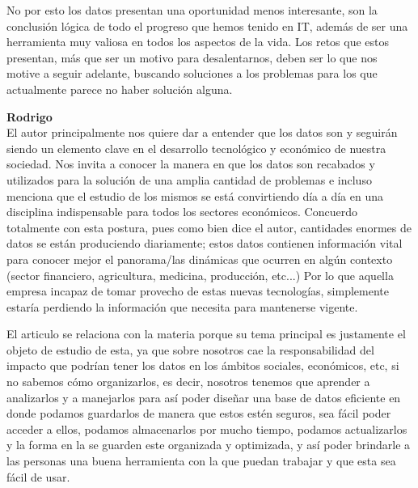 \documentclass[12pt,a4paper]{article}
\begin{document}
\begin{enumerate}
\begin{enumerate}
				No por esto los datos presentan una oportunidad menos interesante,
				son la conclusión lógica de todo el progreso que hemos tenido en
				IT, además de ser una herramienta muy valiosa en todos los aspectos
				de la vida. Los retos que estos presentan, más que ser un motivo
				para desalentarnos, deben ser lo que nos motive a seguir adelante,
				buscando soluciones a los problemas para los que actualmente parece
				no haber solución alguna.
				
				\textbf{Rodrigo}\\	
                      		El autor principalmente nos quiere dar a entender que los datos son 
				y seguirán siendo un elemento clave en el desarrollo tecnológico y
				económico de nuestra sociedad. Nos invita a conocer la manera en que 
				los datos son recabados y utilizados para la solución de una amplia 
				cantidad de problemas e incluso menciona que el estudio de los mismos 
				se está convirtiendo día a día en una disciplina indispensable para 
				todos los sectores económicos. Concuerdo totalmente con esta postura, 
				pues como bien dice el autor, cantidades enormes de datos se están 
				produciendo diariamente; estos datos contienen información vital para 
				conocer mejor el panorama/las dinámicas que ocurren en algún contexto 
				(sector financiero, agricultura, medicina, producción, etc...) Por lo 
				que aquella empresa incapaz de tomar provecho de estas nuevas tecnologías, 
				simplemente estaría perdiendo la información que necesita para mantenerse 
				vigente.

				El articulo se relaciona con la materia porque su tema principal es 
				justamente el objeto de estudio de esta, ya que sobre nosotros 
				cae la responsabilidad del impacto que podrían tener los datos en los 
				ámbitos sociales, económicos, etc, si no sabemos cómo organizarlos, es decir,
				nosotros tenemos que aprender a analizarlos y a manejarlos para así poder 
				diseñar una base de datos eficiente en donde podamos guardarlos de manera que 
				estos estén seguros, sea fácil poder acceder a ellos, podamos almacenarlos por 
				mucho tiempo, podamos actualizarlos y la forma en la se guarden este organizada 
				y optimizada, y así poder brindarle a las personas una buena herramienta con la 
				que puedan trabajar y que esta sea fácil de usar.
				

\end{enumerate}
\end{enumerate}
\end{document}

